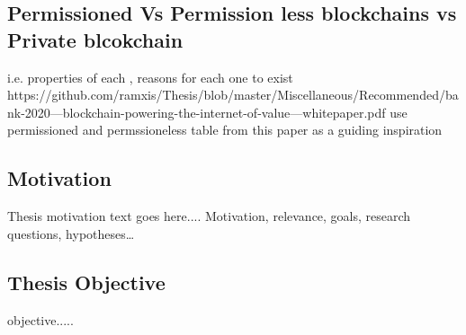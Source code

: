 \subsection{Permissioned Vs Permission less blockchains vs Private blcokchain}
i.e. properties of each , reasons for each one to exist
https://github.com/ramxis/Thesis/blob/master/Miscellaneous/Recommended/bank-2020---blockchain-powering-the-internet-of-value---whitepaper.pdf use permissioned and permssioneless table from this paper as a guiding inspiration

\subsection{Motivation}
Thesis motivation text goes here....
Motivation, relevance, goals, research questions, hypotheses\ldots
\subsection{Thesis Objective}
objective.....
